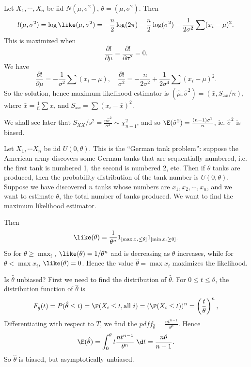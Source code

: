 \documentclass[a4paper]{article}
\begin{document}
\begin{eg}
  Let $X_1, \cdots, X_n$ be iid $N(\mu, \sigma^2)$, $\theta = (\mu, \sigma^2)$. Then
  \[
    l(\mu, \sigma^2) = \log\like(\mu, \sigma^2) = -\frac{n}{2}\log (2\pi) - \frac{n}{2}\log (\sigma^2) - \frac{1}{2\sigma^2}\sum (x_i - \mu)^2.
  \]
  This is maximized when
  \[
    \frac{\partial l}{\partial\mu} = \frac{\partial l}{\partial \sigma^2} = 0.
  \]
  We have
  \[
    \frac{\partial l}{\partial \mu} = -\frac{1}{\sigma^2}\sum (x_i - \mu), \quad \frac{\partial l}{\sigma^2} = -\frac{n}{2\sigma^2} + \frac{1}{2\sigma^4}\sum (x_i - \mu)^2.
  \]
  So the solution, hence maximum likelihood estimator is $(\hat{\mu}, \hat{\sigma}^2) = (\bar x, S_{xx}/n)$, where $\bar{x} = \frac{1}{n}\sum x_i$ and $S_{xx} = \sum(x_i - \bar{x})^2$.

  We shall see later that $S_{XX}/s^2 = \frac{n\hat{\sigma}^2}{\sigma^2}\sim \chi_{n - 1}^2$, and so $\E(\hat{\sigma}^2) = \frac{(n - 1)\sigma^2}{n}$, ie. $\hat{\sigma}^2$ is biased.
\end{eg}

\begin{eg}
  Let $X_1, \cdots X_n$ be iid $U(0, \theta)$. This is the ``German tank problem'': suppose the American army discovers some German tanks that are sequentially numbered, i.e. the first tank is numbered 1, the second is numbered 2, etc. Then if $\theta$ tanks are produced, then the probability distribution of the tank number is $U(0, \theta)$. Suppose we have discovered $n$ tanks whose numbers are $x_1, x_2, \cdots, x_n$, and we want to estimate $\theta$, the total number of tanks produced. We want to find the maximum likelihood estimator.
  
  Then
  \[
    \like(\theta) = \frac{1}{\theta^n}1_{[\max x_i \leq \theta]}1_{[\min x_i\geq 0]}.
  \]
  So for $\theta\geq \max _i$, $\like (\theta) = 1/\theta^n$ and is decreasing as $\theta$ increases, while for $\theta < \max x_i$, $\like (\theta) = 0$. Hence the value $\hat{\theta} = \max x_i$ maximizes the likelihood.

  Is $\hat{\theta}$ unbiased? First we need to find the distribution of $\hat{\theta}$. For $0 \leq t \leq \theta$, the distribution function of $\hat{\theta}$ is
  \[
    F_{\hat{\theta}}(t) = P(\hat{\theta} \leq t) = \P(X_i \leq t, \text{all }i) = (\P(X_i \leq t))^n = \left(\frac{t}{\theta}\right)^n,
  \]
  Differentiating with respect to $T$, we find the $pdf f_{\hat{\theta}} = \frac{nt^{n - 1}}{\theta^n}$. Hence
  \[
    \E(\hat{\theta}) = \int_0^\theta t\frac{nt^{n - 1}}{\theta^n} \;\d t = \frac{n\theta}{n + 1}.
  \]
  So $\hat{\theta}$ is biased, but asymptotically unbiased.
\end{eg}
\end{document}
